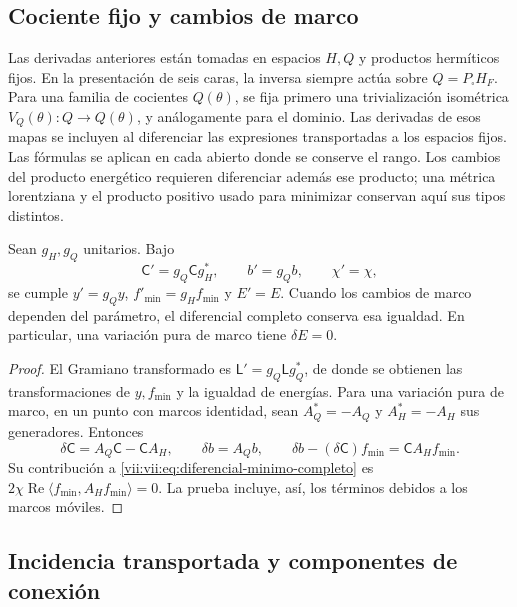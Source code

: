 \subsection{Cociente fijo y cambios de marco}
\label{vii:vii:subsec:marcos-minimo}

Las derivadas anteriores están tomadas en espacios \(H,Q\) y productos
hermíticos fijos. En la presentación de seis caras, la inversa siempre
actúa sobre \(Q=P_\square H_F\). Para una familia de cocientes
\(Q(\theta)\), se fija primero una trivialización isométrica
\(V_Q(\theta):Q\to Q(\theta)\), y análogamente para el dominio.
Las derivadas de esos mapas se incluyen al diferenciar las expresiones
transportadas a los espacios fijos. Las fórmulas se aplican en cada
abierto donde se conserve el rango. Los cambios del producto energético
requieren diferenciar además ese producto; una métrica lorentziana
y el producto positivo usado para minimizar conservan aquí sus tipos
distintos.

\begin{proposition}
\label{vii:vii:prop:covariancia-minimo}
Sean \(g_H,g_Q\) unitarios. Bajo
\[
 \mathsf C'=g_Q\mathsf C g_H^*,\qquad b'=g_Qb,\qquad \chi'=\chi,
\]
se cumple \(y'=g_Qy\), \(f'_{\min}=g_Hf_{\min}\) y \(E'=E\).
Cuando los cambios de marco dependen del parámetro, el diferencial
completo conserva esa igualdad. En particular, una variación pura de
marco tiene \(\delta E=0\).
\end{proposition}

\begin{proof}
El Gramiano transformado es \(\mathsf L'=g_Q\mathsf Lg_Q^*\),
de donde se obtienen las transformaciones de \(y,f_{\min}\) y
la igualdad de energías. Para una variación pura de marco, en un punto
con marcos identidad, sean \(A_Q^*=-A_Q\) y \(A_H^*=-A_H\)
sus generadores. Entonces
\[
 \delta\mathsf C=A_Q\mathsf C-\mathsf C A_H,\qquad
 \delta b=A_Qb,\qquad
 \delta b-(\delta\mathsf C)f_{\min}=\mathsf C A_Hf_{\min}.
\]
Su contribución a \eqref{vii:vii:eq:diferencial-minimo-completo} es
\(2\chi\operatorname{Re}\langle f_{\min},A_Hf_{\min}\rangle=0\).
La prueba incluye, así, los términos debidos a los marcos móviles.
\end{proof}

\subsection{Incidencia transportada y componentes de conexión}
\label{vii:vii:subsec:incidencia-conexion-minima}

